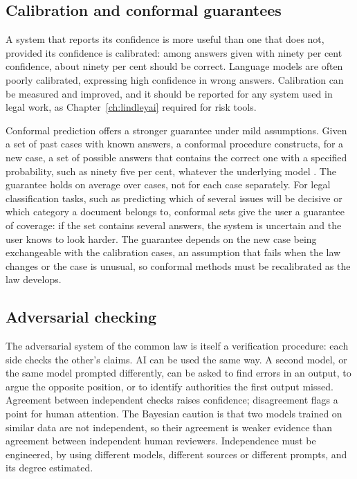 \subsection{Calibration and conformal guarantees}

A system that reports its confidence is more useful than one that does not, provided its confidence is calibrated: among answers given with ninety per cent confidence, about ninety per cent should be correct. Language models are often poorly calibrated, expressing high confidence in wrong answers. Calibration can be measured and improved, and it should be reported for any system used in legal work, as Chapter~\ref{ch:lindleyai} required for risk tools.

Conformal prediction offers a stronger guarantee under mild assumptions. Given a set of past cases with known answers, a conformal procedure constructs, for a new case, a set of possible answers that contains the correct one with a specified probability, such as ninety five per cent, whatever the underlying model \citep{angelopoulos2023}. The guarantee holds on average over cases, not for each case separately. For legal classification tasks, such as predicting which of several issues will be decisive or which category a document belongs to, conformal sets give the user a guarantee of coverage: if the set contains several answers, the system is uncertain and the user knows to look harder. The guarantee depends on the new case being exchangeable with the calibration cases, an assumption that fails when the law changes or the case is unusual, so conformal methods must be recalibrated as the law develops.

\subsection{Adversarial checking}

The adversarial system of the common law is itself a verification procedure: each side checks the other's claims. AI can be used the same way. A second model, or the same model prompted differently, can be asked to find errors in an output, to argue the opposite position, or to identify authorities the first output missed. Agreement between independent checks raises confidence; disagreement flags a point for human attention. The Bayesian caution is that two models trained on similar data are not independent, so their agreement is weaker evidence than agreement between independent human reviewers. Independence must be engineered, by using different models, different sources or different prompts, and its degree estimated.


